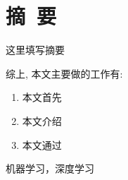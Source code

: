 \renewcommand{\baselinestretch}{1.345}
\fontsize{12pt}{14.4pt}\selectfont

\chapter*{摘~要}


这里填写摘要

综上, 本文主要做的工作有:
\vspace{-10pt}
\begin{enumerate}
	\item 本文首先
	\item 本文介绍
	\item 本文通过
\end{enumerate}
\vspace{-10pt}

\vspace{1em}
机器学习，深度学习

\clearpage
\endinput
